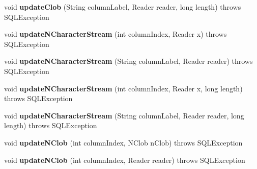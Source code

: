 \begin{DoxyCompactItemize}
void {\bfseries update\+Clob} (String column\+Label, Reader reader, long length)  throws S\+Q\+L\+Exception 
\item 
\mbox{\label{classcom_1_1mysql_1_1cj_1_1jdbc_1_1result_1_1_result_set_impl_a68aaf9c29c85884d74390584ea1ef955}} 
void {\bfseries update\+N\+Character\+Stream} (int column\+Index, Reader x)  throws S\+Q\+L\+Exception 
\item 
\mbox{\label{classcom_1_1mysql_1_1cj_1_1jdbc_1_1result_1_1_result_set_impl_abc2e7f0e85ba26a0cfa6379b48203b99}} 
void {\bfseries update\+N\+Character\+Stream} (String column\+Label, Reader reader)  throws S\+Q\+L\+Exception 
\item 
\mbox{\label{classcom_1_1mysql_1_1cj_1_1jdbc_1_1result_1_1_result_set_impl_a04995ba1542811386004b3e2c91cd25e}} 
void {\bfseries update\+N\+Character\+Stream} (int column\+Index, Reader x, long length)  throws S\+Q\+L\+Exception 
\item 
\mbox{\label{classcom_1_1mysql_1_1cj_1_1jdbc_1_1result_1_1_result_set_impl_a53b0db21a9974df776ae363e0f1bc76e}} 
void {\bfseries update\+N\+Character\+Stream} (String column\+Label, Reader reader, long length)  throws S\+Q\+L\+Exception 
\item 
\mbox{\label{classcom_1_1mysql_1_1cj_1_1jdbc_1_1result_1_1_result_set_impl_a9598931f50dfced2c727e393aa7a4997}} 
void {\bfseries update\+N\+Clob} (int column\+Index, N\+Clob n\+Clob)  throws S\+Q\+L\+Exception 
\item 
\mbox{\label{classcom_1_1mysql_1_1cj_1_1jdbc_1_1result_1_1_result_set_impl_a62eb1f1e905bd763bed51c3b3a5d9186}} 
void {\bfseries update\+N\+Clob} (int column\+Index, Reader reader)  throws S\+Q\+L\+Exception 
\item 
\mbox{\label{classcom_1_1mysql_1_1cj_1_1jdbc_1_1result_1_1_result_set_impl_a4db9298794d700d053d1fcb1cd75acf8}} 

\end{DoxyCompactItemize}
